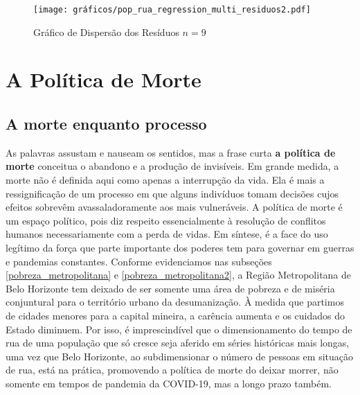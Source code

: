 \documentclass[12pt]{article}
\begin{document}
\begin{figure}[H]
\centering
	\caption{Gráfico de Dispersão dos Resíduos  $n = 9$}
	\texttt{[image: gráficos/pop\_rua\_regression\_multi\_residuos2.pdf]}
	 \label{fig:gráfico10}%
\end{figure}

\newpage

\section{A Política de Morte}
\vspace{1cm}

\subsection{A morte enquanto processo}
\label{politica_morte}

As palavras assustam e nauseam os sentidos, mas a frase curta \textbf{a política de morte} conceitua o abandono e a produção de invisíveis. Em grande medida, a morte não é definida aqui como apenas a interrupção da vida. Ela é mais a ressignificação de um processo em que alguns indivíduos tomam decisões cujos efeitos sobrevêm avassaladoramente aos mais vulneráveis. A política de morte é um espaço político, pois diz respeito essencialmente à resolução de conflitos humanos necessariamente com a perda de vidas. Em síntese, é a face do uso legítimo da força que parte importante dos poderes tem para governar em guerras e pandemias constantes. Conforme evidenciamos nas subseções \ref{pobreza_metropolitana} e \ref{pobreza_metropolitana2}, a Região Metropolitana de Belo Horizonte tem deixado de ser somente uma área de pobreza e de miséria conjuntural para o território urbano da desumanização. À medida que partimos de cidades menores para a capital mineira, a carência aumenta e os cuidados do Estado diminuem. Por isso, é imprescindível que o dimensionamento do tempo de rua de uma população que só cresce seja aferido em séries históricas mais longas, uma vez que Belo Horizonte, ao subdimensionar o número de pessoas em situação de rua, está na prática, promovendo a política de morte do deixar morrer, não somente em tempos de pandemia da COVID-19, mas a longo prazo também.\\
\end{document}
